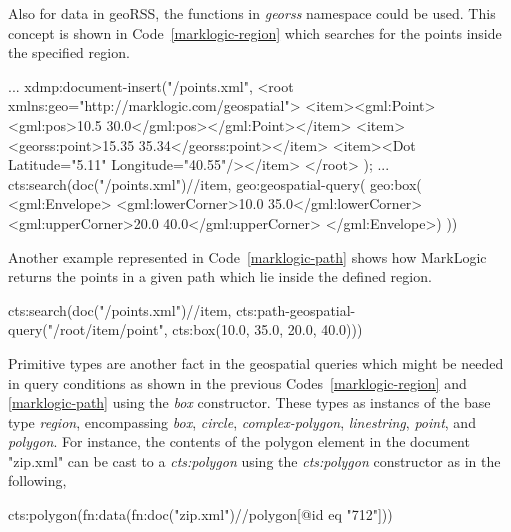 \documentclass[a4paper,12pt]{article}
\begin{document}
Also for data in geoRSS, the functions in \textit{georss} namespace could be used. 
This concept is shown in Code~\ref{marklogic-region} which searches for the points inside the specified region. 
\vspace{10px}
\begin{fakeXML}[escapechar=\%,label=marklogic-region,caption=A query example in MarkLogic]
...
xdmp:document-insert("/points.xml",
<root xmlns:geo="http://marklogic.com/geospatial">
  <item><gml:Point><gml:pos>10.5 30.0</gml:pos></gml:Point></item>
  <item><georss:point>15.35 35.34</georss:point></item>
  <item><Dot Latitude="5.11" Longitude="40.55"/></item>
</root> );
 ...
cts:search(doc("/points.xml")//item, 
 geo:geospatial-query(
   geo:box(
     <gml:Envelope>
       <gml:lowerCorner>10.0 35.0</gml:lowerCorner>
       <gml:upperCorner>20.0 40.0</gml:upperCorner>
     </gml:Envelope>)
 ))
 
 \end{fakeXML}
\vspace{10px}
Another example represented in Code~\ref{marklogic-path} shows how MarkLogic returns the 
points in a given path which lie inside the defined region.
\vspace{10px}
\begin{fakeXML}[escapechar=\%,label=marklogic-path,caption=Another query example in MarkLogic]
cts:search(doc("/points.xml")//item,
  cts:path-geospatial-query("/root/item/point", 
  			cts:box(10.0, 35.0, 20.0, 40.0)))
\end{fakeXML}
\vspace{10px}

Primitive types are another fact in the geospatial queries which might be needed in query conditions 
as shown in the previous Codes~\ref{marklogic-region} and \ref{marklogic-path} using the \textit{box} constructor. These types as instancs of the base type \textit{region}, encompassing \textit{box}, \textit{circle}, \textit{complex-polygon}, \textit{linestring}, \textit{point}, and \textit{polygon}. For instance, the contents of the polygon element in the document "zip.xml" can be cast to a \textit{cts:polygon} using the \textit{cts:polygon} constructor as in the following,
\vspace{10px}
\begin{fakeJSON}
cts:polygon(fn:data(fn:doc("zip.xml")//polygon[@id eq "712"]))
\end{fakeJSON}
\vspace{10px}
\end{document}
